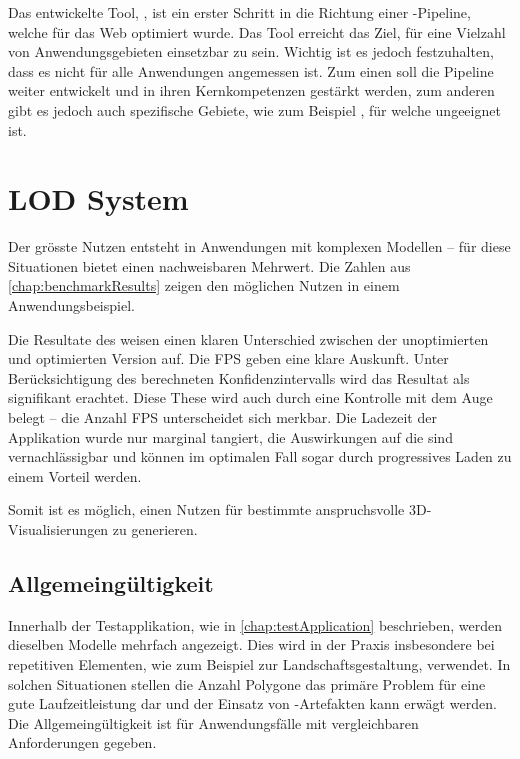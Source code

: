 Das entwickelte Tool, , ist ein erster Schritt in die Richtung einer -Pipeline, welche für das Web optimiert wurde. Das Tool erreicht das Ziel, für eine Vielzahl von Anwendungsgebieten einsetzbar zu sein. Wichtig ist es jedoch festzuhalten, dass es nicht für alle Anwendungen angemessen ist. Zum einen soll die Pipeline weiter entwickelt und in ihren Kernkompetenzen gestärkt werden, zum anderen gibt es jedoch auch spezifische Gebiete, wie zum Beispiel , für welche  ungeeignet ist.

\section{LOD System}

Der grösste Nutzen entsteht in Anwendungen mit komplexen Modellen – für diese Situationen bietet  einen nachweisbaren Mehrwert. Die Zahlen aus \autoref{chap:benchmarkResults} zeigen den möglichen Nutzen in einem Anwendungsbeispiel.

Die Resultate des  weisen einen klaren Unterschied zwischen der unoptimierten und optimierten Version auf. Die \gls{FPS} geben eine klare Auskunft. Unter Berücksichtigung des berechneten Konfidenzintervalls wird das Resultat als signifikant erachtet. Diese These wird auch durch eine Kontrolle mit dem Auge belegt – die Anzahl \gls{FPS} unterscheidet sich merkbar. Die Ladezeit der Applikation wurde nur marginal tangiert, die Auswirkungen auf die  sind vernachlässigbar und können im optimalen Fall sogar durch progressives Laden zu einem Vorteil werden.

Somit ist es möglich, einen Nutzen für bestimmte anspruchsvolle 3D-Visualisierungen zu generieren.

\subsection{Allgemeingültigkeit}

Innerhalb der Testapplikation, wie in \autoref{chap:testApplication} beschrieben, werden dieselben Modelle mehrfach angezeigt. Dies wird in der Praxis insbesondere bei repetitiven Elementen, wie zum Beispiel zur Landschaftsgestaltung, verwendet. In solchen Situationen stellen die Anzahl Polygone das primäre Problem für eine gute Laufzeitleistung dar und der Einsatz von -Artefakten kann erwägt werden. Die Allgemeingültigkeit ist für Anwendungsfälle mit vergleichbaren Anforderungen gegeben.

